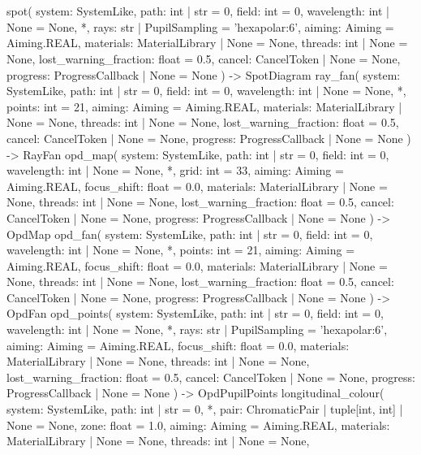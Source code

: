 \documentclass[11pt,a4paper,openany]{book}
\DeclareRobustCommand{\code}[1]{\texttt{\directlua{rttcode("\luaescapestring{\detokenize{#1}}")}}}
\begin{document}
\section{\code{rt.analysis}}
\begin{signatur}
spot(
    system: SystemLike,
    path: int | str = 0,
    field: int = 0,
    wavelength: int | None = None,
    *,
    rays: str | PupilSampling = 'hexapolar:6',
    aiming: Aiming = Aiming.REAL,
    materials: MaterialLibrary | None = None,
    threads: int | None = None,
    lost_warning_fraction: float = 0.5,
    cancel: CancelToken | None = None,
    progress: ProgressCallback | None = None
) -> SpotDiagram
ray_fan(
    system: SystemLike,
    path: int | str = 0,
    field: int = 0,
    wavelength: int | None = None,
    *,
    points: int = 21,
    aiming: Aiming = Aiming.REAL,
    materials: MaterialLibrary | None = None,
    threads: int | None = None,
    lost_warning_fraction: float = 0.5,
    cancel: CancelToken | None = None,
    progress: ProgressCallback | None = None
) -> RayFan
opd_map(
    system: SystemLike,
    path: int | str = 0,
    field: int = 0,
    wavelength: int | None = None,
    *,
    grid: int = 33,
    aiming: Aiming = Aiming.REAL,
    focus_shift: float = 0.0,
    materials: MaterialLibrary | None = None,
    threads: int | None = None,
    lost_warning_fraction: float = 0.5,
    cancel: CancelToken | None = None,
    progress: ProgressCallback | None = None
) -> OpdMap
opd_fan(
    system: SystemLike,
    path: int | str = 0,
    field: int = 0,
    wavelength: int | None = None,
    *,
    points: int = 21,
    aiming: Aiming = Aiming.REAL,
    focus_shift: float = 0.0,
    materials: MaterialLibrary | None = None,
    threads: int | None = None,
    lost_warning_fraction: float = 0.5,
    cancel: CancelToken | None = None,
    progress: ProgressCallback | None = None
) -> OpdFan
opd_points(
    system: SystemLike,
    path: int | str = 0,
    field: int = 0,
    wavelength: int | None = None,
    *,
    rays: str | PupilSampling = 'hexapolar:6',
    aiming: Aiming = Aiming.REAL,
    focus_shift: float = 0.0,
    materials: MaterialLibrary | None = None,
    threads: int | None = None,
    lost_warning_fraction: float = 0.5,
    cancel: CancelToken | None = None,
    progress: ProgressCallback | None = None
) -> OpdPupilPoints
longitudinal_colour(
    system: SystemLike,
    path: int | str = 0,
    *,
    pair: ChromaticPair | tuple[int, int] | None = None,
    zone: float = 1.0,
    aiming: Aiming = Aiming.REAL,
    materials: MaterialLibrary | None = None,
    threads: int | None = None,

\end{signatur}
\end{document}
